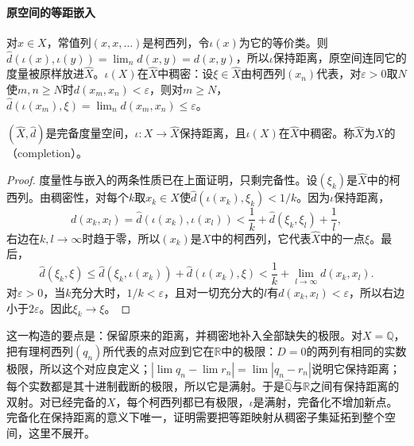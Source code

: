 \paragraph{原空间的等距嵌入}
对$x\in X$，常值列$(x,x,\dots)$是柯西列，令$\iota(x)$为它的等价类。则$\hat d(\iota(x),\iota(y))=\lim_nd(x,y)=d(x,y)$，所以$\iota$保持距离，原空间连同它的度量被原样放进$\widehat X$。$\iota(X)$在$\widehat X$中稠密：设$\xi\in\widehat X$由柯西列$(x_n)$代表，对$\varepsilon>0$取$N$使$m,n\geq N$时$d(x_m,x_n)<\varepsilon$，则对$m\geq N$，$\hat d(\iota(x_m),\xi)=\lim_nd(x_m,x_n)\leq\varepsilon$。

\begin{theorem}[完备化]
\label{thm:metric-completion}
$(\widehat X,\hat d)$是完备度量空间，$\iota:X\to\widehat X$保持距离，且$\iota(X)$在$\widehat X$中稠密。称$\widehat X$为$X$的（completion）。
\end{theorem}

\begin{proof}
度量性与嵌入的两条性质已在上面证明，只剩完备性。设$(\xi_k)$是$\widehat X$中的柯西列。由稠密性，对每个$k$取$x_k\in X$使$\hat d(\iota(x_k),\xi_k)<1/k$。因为$\iota$保持距离，
\[
  d(x_k,x_l)=\hat d(\iota(x_k),\iota(x_l))<\frac1k+\hat d(\xi_k,\xi_l)+\frac1l,
\]
右边在$k,l\to\infty$时趋于零，所以$(x_k)$是$X$中的柯西列，它代表$\widehat X$中的一点$\xi$。最后，
\[
  \hat d(\xi_k,\xi)\leq\hat d(\xi_k,\iota(x_k))+\hat d(\iota(x_k),\xi)<\frac1k+\lim_{l\to\infty}d(x_k,x_l).
\]
对$\varepsilon>0$，当$k$充分大时，$1/k<\varepsilon$，且对一切充分大的$l$有$d(x_k,x_l)<\varepsilon$，所以右边小于$2\varepsilon$。因此$\xi_k\to\xi$。
\end{proof}

这一构造的要点是：保留原来的距离，并稠密地补入全部缺失的极限。对$X=\mathbb Q$，把有理柯西列$(q_n)$所代表的点对应到它在$\mathbb R$中的极限：$D=0$的两列有相同的实数极限，所以这个对应良定义；$|\lim q_n-\lim r_n|=\lim|q_n-r_n|$说明它保持距离；每个实数都是其十进制截断的极限，所以它是满射。于是$\widehat{\mathbb Q}$与$\mathbb R$之间有保持距离的双射。对已经完备的$X$，每个柯西列都已有极限，$\iota$是满射，完备化不增加新点。完备化在保持距离的意义下唯一，证明需要把等距映射从稠密子集延拓到整个空间，这里不展开。
